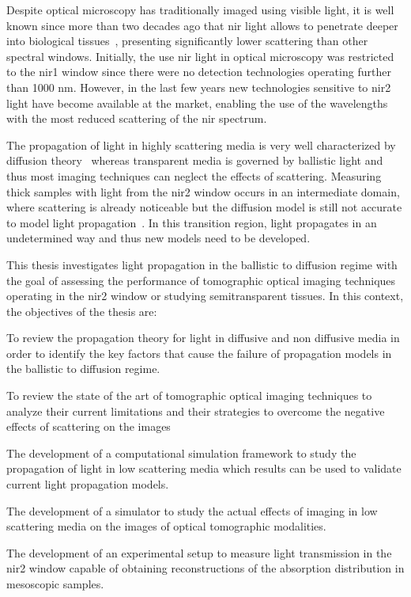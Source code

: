 Despite optical microscopy has traditionally imaged using visible light, it is well known since more than two decades ago that \acrfull{nir} light allows to penetrate deeper into biological tissues~\cite{Weissleder2001,Ntziachristos2002}, presenting significantly lower scattering than other spectral windows. Initially, the use \gls{nir} light in optical microscopy was restricted to the \acrfull{nir1} window since there were no detection technologies operating further than 1000 nm. However, in the last few years new technologies sensitive to \gls{nir2} light have become available at the market, enabling the use of the wavelengths with the most reduced scattering of the \gls{nir} spectrum. 

The propagation of light in highly scattering media is very well characterized by diffusion theory~\cite{Ishimaru1978, Lorenzo2012} whereas transparent media is governed by ballistic light and thus most imaging techniques can neglect the effects of scattering. Measuring thick samples with light from the \gls{nir2} window occurs in an intermediate domain, where scattering is already noticeable but the diffusion model is still not accurate to model light propagation~\cite{Yoo1990}. In this transition region, light propagates in an undetermined way and thus new models need to be developed.

This thesis investigates light propagation in the ballistic to diffusion regime with the goal of assessing the performance of tomographic optical imaging techniques operating in the \gls{nir2} window or studying semitransparent tissues. In this context, the objectives of the thesis are:

\begin{enumerate}

{\setlength\itemindent{25pt} \item To review the propagation theory for light in diffusive and non diffusive media in order to identify the key factors that cause the failure of propagation models in the ballistic to diffusion regime.
}
{\setlength\itemindent{25pt} \item To review the state of the art of tomographic optical imaging techniques to analyze their current limitations and their strategies to overcome the negative effects of scattering on the images
}
{\setlength\itemindent{25pt} \item The development of a computational simulation framework to study the propagation of light in low scattering media which results can be used to validate current light propagation models.
}
{\setlength\itemindent{25pt} \item The development of a simulator to study the actual effects of imaging in low scattering media on the images of optical tomographic modalities.
}
{\setlength\itemindent{25pt} \item The development of an experimental setup to measure light transmission in the \gls{nir2} window capable of obtaining reconstructions of the absorption distribution in mesoscopic samples.
}
\end{enumerate}

